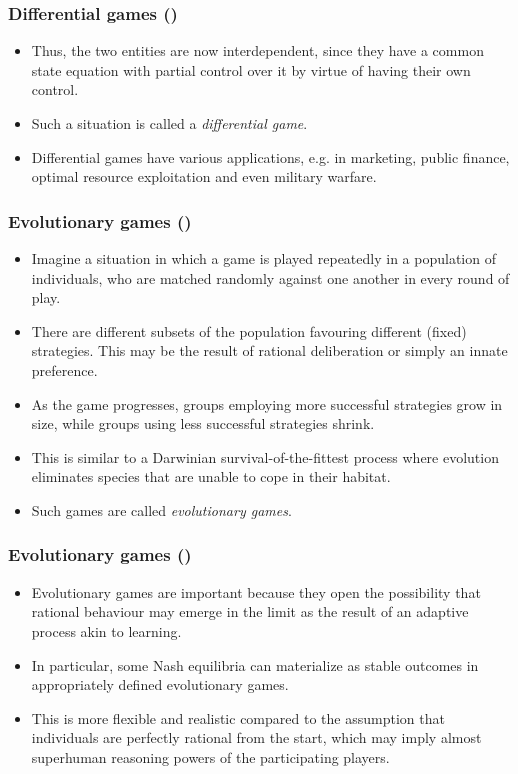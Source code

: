 \documentclass[10pt]{beamer}
\theoremstyle{definition}
\begin{document}
\begin{frame}[fragile]
\frametitle{Differential games ()}
\begin{itemize}\itemsep1em
\item Thus, the two entities are now interdependent, since they have a common state equation with partial control over it by virtue of having their own control.
\item Such a situation is called a \emph{differential game}. 
\item Differential games have various applications, e.g. in marketing, public finance, optimal resource exploitation and even military warfare.
\end{itemize}
\end{frame}

\setcounter{slidenum}{1}
\begin{frame}[fragile]
\frametitle{Evolutionary games ()}
\begin{itemize}\itemsep1em
\item Imagine a situation in which a game is played repeatedly in a population of individuals, who are matched randomly against one another in every round of play.
\item There are different subsets of the population favouring different (fixed) strategies. This may be the result of rational deliberation or simply an innate preference.
\item As the game progresses, groups employing more successful strategies grow in size, while groups using less successful strategies shrink.
\item This is similar to a Darwinian survival-of-the-fittest process where evolution eliminates species that are unable to cope in their habitat.
\item Such games are called \emph{evolutionary games}.
\end{itemize}
\end{frame}

\begin{frame}[fragile]
\frametitle{Evolutionary games ()}
\begin{itemize}\itemsep1em
\item Evolutionary games are important because they open the possibility that rational behaviour may emerge in the limit as the result of an adaptive process akin to learning.
\item In particular, some Nash equilibria can materialize as stable outcomes in appropriately defined evolutionary games.
\item This is more flexible and realistic compared to the assumption that individuals are perfectly rational from the start, which may imply almost superhuman reasoning powers of the participating players.
\end{itemize}
\end{frame}
\end{document}
